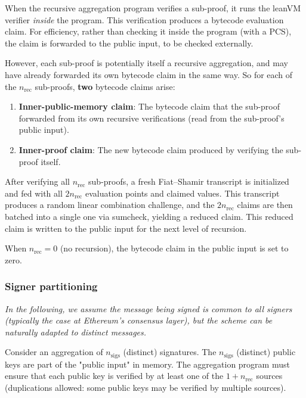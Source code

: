\documentclass{article}
\theoremstyle{definition}
\begin{document}
When the recursive aggregation program verifies a sub-proof, it runs the leanVM verifier \emph{inside} the program. This verification produces a bytecode evaluation claim. For efficiency, rather than checking it inside the program (with a PCS), the claim is forwarded to the public input, to be checked externally.

However, each sub-proof is potentially itself a recursive aggregation, and may have already forwarded its own bytecode claim in the same way. So for each of the $n_{\text{rec}}$ sub-proofs, \textbf{two} bytecode claims arise:

\begin{enumerate}
    \item \textbf{Inner-public-memory claim}: The bytecode claim that the sub-proof forwarded from its own recursive verifications (read from the sub-proof's public input).

    \item \textbf{Inner-proof claim}: The new bytecode claim produced by verifying the sub-proof itself.
\end{enumerate}

After verifying all $n_{\text{rec}}$ sub-proofs, a fresh Fiat--Shamir transcript is initialized and fed with all $2 n_{\text{rec}}$ evaluation points and claimed values. This transcript produces a random linear combination challenge, and the $2 n_{\text{rec}}$ claims are then batched into a single one via sumcheck, yielding a reduced claim. This reduced claim is written to the public input for the next level of recursion.

When $n_{\text{rec}} = 0$ (no recursion), the bytecode claim in the public input is set to zero.


\subsubsection{Signer partitioning}\label{sec:signer-partitioning}

\emph{
In the following, we assume  the message being signed is common to all signers (typically the case at Ethereum's consensus layer), but the scheme can be naturally adapted to distinct messages.}

\vspace{3mm}

Consider an aggregation of $n_{\text{sigs}}$ (distinct) signatures. The $n_{\text{sigs}}$ (distinct) public keys are part of the "public input" in memory. The aggregation program must ensure that each public key is verified by at least one of the $1 + n_{\text{rec}}$ sources (duplications allowed: some public keys may be verified by multiple sources).
\end{document}
